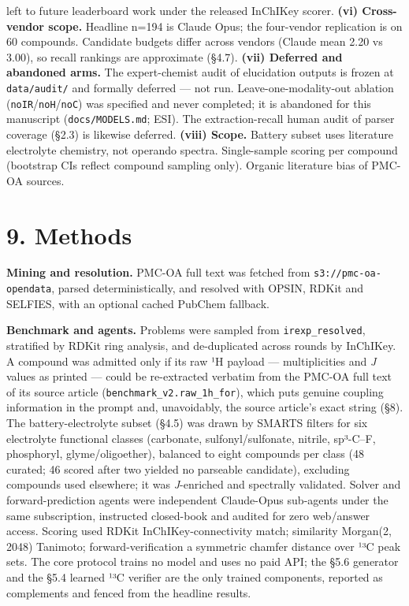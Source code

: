 \documentclass[
  10pt,
]{article}
\begin{document}
left to future leaderboard work under the released InChIKey scorer.
\textbf{(vi) Cross-vendor scope.} Headline n=194 is Claude Opus; the
four-vendor replication is on 60 compounds. Candidate budgets differ
across vendors (Claude mean 2.20 vs 3.00), so recall rankings are
approximate (§4.7). \textbf{(vii) Deferred and abandoned arms.} The
expert-chemist audit of elucidation outputs is frozen at
\texttt{data/\hspace{0pt}audit/} and formally deferred --- not run.
Leave-one-modality-out ablation
(\texttt{noIR}/\texttt{noH}/\texttt{noC}) was specified and never
completed; it is abandoned for this manuscript
(\texttt{docs/\hspace{0pt}MODELS.md}; ESI). The extraction-recall human
audit of parser coverage (§2.3) is likewise deferred. \textbf{(viii)
Scope.} Battery subset uses literature electrolyte chemistry, not
operando spectra. Single-sample scoring per compound (bootstrap CIs
reflect compound sampling only). Organic literature bias of PMC-OA
sources.

\hypertarget{methods}{%
\section{9. Methods}\label{methods}}

\textbf{Mining and resolution.} PMC-OA full text was fetched from
\texttt{s3:/\hspace{0pt}/\hspace{0pt}pmc-oa-opendata}, parsed
deterministically, and resolved with OPSIN, RDKit and SELFIES, with an
optional cached PubChem fallback.

\textbf{Benchmark and agents.} Problems were sampled from
\texttt{irexp\_resolved}, stratified by RDKit ring analysis, and
de-duplicated across rounds by InChIKey. A compound was admitted only if
its raw ¹H payload --- multiplicities and \emph{J} values as printed ---
could be re-extracted verbatim from the PMC-OA full text of its source
article (\texttt{benchmark\_v2.raw\_1h\_for}), which puts genuine
coupling information in the prompt and, unavoidably, the source
article's exact string (§8). The battery-electrolyte subset (§4.5) was
drawn by SMARTS filters for six electrolyte functional classes
(carbonate, sulfonyl/sulfonate, nitrile, sp³-C--F, phosphoryl,
glyme/oligoether), balanced to eight compounds per class (48 curated; 46
scored after two yielded no parseable candidate), excluding compounds
used elsewhere; it was \emph{J}-enriched and spectrally validated.
Solver and forward-prediction agents were independent Claude-Opus
sub-agents under the same subscription, instructed closed-book and
audited for zero web/answer access. Scoring used RDKit
InChIKey-connectivity match; similarity Morgan(2, 2048) Tanimoto;
forward-verification a symmetric chamfer distance over ¹³C peak sets.
The core protocol trains no model and uses no paid API; the §5.6
generator and the §5.4 learned ¹³C verifier are the only trained
components, reported as complements and fenced from the headline
results.
\end{document}
